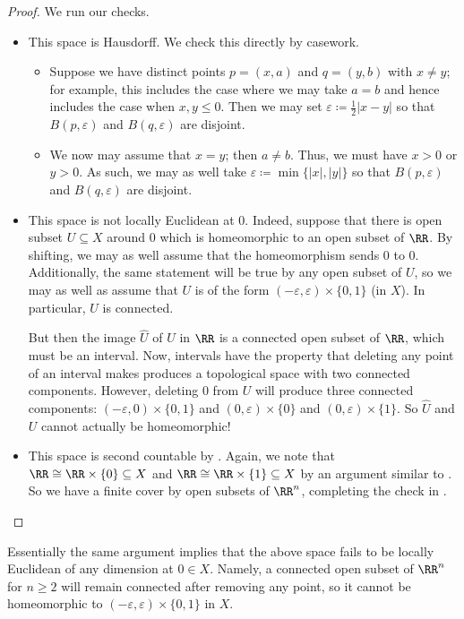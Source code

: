 \documentclass[../notes.tex]{subfiles}
\begin{document}
\begin{proof}
	We run our checks.
	\begin{itemize}
		\item This space is Hausdorff. We check this directly by casework.
		\begin{itemize}
			\item Suppose we have distinct points $p=(x,a)$ and $q=(y,b)$ with $x\ne y$; for example, this includes the case where we may take $a=b$ and hence includes the case when $x,y\le0$. Then we may set $\varepsilon\coloneqq\frac12\left|x-y\right|$ so that $B(p,\varepsilon)$ and $B(q,\varepsilon)$ are disjoint.
			\item We now may assume that $x=y$; then $a\ne b$. Thus, we must have $x>0$ or $y>0$. As such, we may as well take $\varepsilon\coloneqq\min\{\left|x\right|,\left|y\right|\}$ so that $B(p,\varepsilon)$ and $B(q,\varepsilon)$ are disjoint.
		\end{itemize}

		\item This space is not locally Euclidean at $0$. Indeed, suppose that there is open subset $U\subseteq X$ around $0$ which is homeomorphic to an open subset of $\RR$. By shifting, we may as well assume that the homeomorphism sends $0$ to $0$. Additionally, the same statement will be true by any open subset of $U$, so we may as well as assume that $U$ is of the form $(-\varepsilon,\varepsilon)\times\{0,1\}$ (in $X$). In particular, $U$ is connected.

		But then the image $\widehat U$ of $U$ in $\RR$ is a connected open subset of $\RR$, which must be an interval. Now, intervals have the property that deleting any point of an interval makes produces a topological space with two connected components. However, deleting $0$ from $U$ will produce three connected components: $(-\varepsilon,0)\times\{0,1\}$ and $(0,\varepsilon)\times\{0\}$ and $(0,\varepsilon)\times\{1\}$. So $\widehat U$ and $U$ cannot actually be homeomorphic!

		\item This space is second countable by . Again, we note that $\RR\cong\RR\times\{0\}\subseteq X$ and $\RR\cong\RR\times\{1\}\subseteq X$ by an argument similar to . So we have a finite cover by open subsets of $\RR^n$, completing the check in .
		\qedhere
	\end{itemize}
\end{proof}
\begin{remark}
	Essentially the same argument implies that the above space fails to be locally Euclidean of any dimension at $0\in X$. Namely, a connected open subset of $\RR^n$ for $n\ge2$ will remain connected after removing any point, so it cannot be homeomorphic to $(-\varepsilon,\varepsilon)\times\{0,1\}$ in $X$.
\end{remark}
\end{document}
